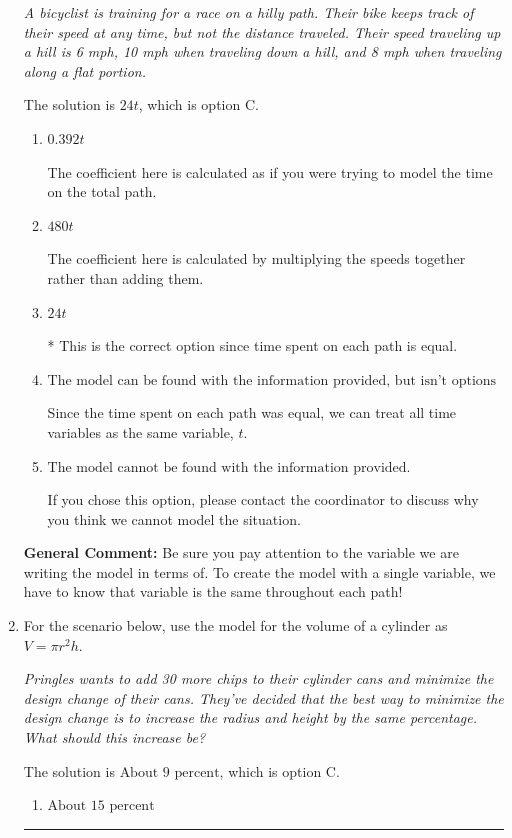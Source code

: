 \documentclass{extbook}[14pt]
\newcommand{\litem}[1]{\item #1

\rule{\textwidth}{0.4pt}}
\begin{document}
\begin{enumerate}
{\begin{center}
    \textit{ A bicyclist is training for a race on a hilly path. Their bike keeps track of their speed at any time, but not the distance traveled. Their speed traveling up a hill is 6 mph, 10 mph when traveling down a hill, and 8 mph when traveling along a flat portion. }
\end{center}
The solution is \( 24 t \), which is option C.\begin{enumerate}[label=\Alph*.]
\item \( 0.392 t \)

The coefficient here is calculated as if you were trying to model the time on the total path.
\item \( 480 t \)

The coefficient here is calculated by multiplying the speeds together rather than adding them.
\item \( 24 t \)

* This is the correct option since time spent on each path is equal.
\item \( \text{The model can be found with the information provided, but isn't options 1-3.} \)

Since the time spent on each path was equal, we can treat all time variables as the same variable, $t$.
\item \( \text{The model cannot be found with the information provided.} \)

If you chose this option, please contact the coordinator to discuss why you think we cannot model the situation.
\end{enumerate}

\textbf{General Comment:} Be sure you pay attention to the variable we are writing the model in terms of. To create the model with a single variable, we have to know that variable is the same throughout each path!
}
\litem{
For the scenario below, use the model for the volume of a cylinder as $V = \pi r^2 h$.

\begin{center}
    \textit{ Pringles wants to add 30 \text{percent} more chips to their cylinder cans and minimize the design change of their cans. They've decided that the best way to minimize the design change is to increase the radius and height by the same percentage. What should this increase be? }
\end{center}
The solution is \( \text{About } 9 \text{ percent} \), which is option C.\begin{enumerate}[label=\Alph*.]
\item \( \text{About } 15 \text{ percent} \)


\end{enumerate}}
\end{enumerate}
\end{document}
